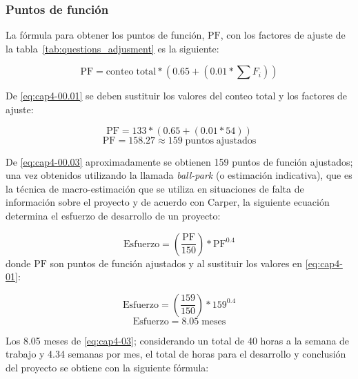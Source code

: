 \subsubsection*{Puntos de función}

La fórmula para obtener los puntos de función, $\mathrm{PF}$, con los factores de ajuste de la tabla~\ref{tab:questions_adjusment} es la siguiente:

\begin{equation} \label{eq:cap4-00.01}
	\mathrm{PF} = \mathrm{conteo\; total} *  (0.65 + (0.01 * \sum F_i))
\end{equation}

De \eqref{eq:cap4-00.01} se deben sustituir los valores del conteo total y los factores de ajuste:

\begin{equation} \label{eq:cap4-00.02}
	\mathrm{PF} =  133 *  (0.65 + (0.01 * 54))
\end{equation}
\begin{equation} \label{eq:cap4-00.03}
	\mathrm{PF} = 158.27 \approx 159 \mathrm{\;puntos\; ajustados}
\end{equation}


De \eqref{eq:cap4-00.03} aproximadamente se obtienen 159 puntos de función ajustados; una vez obtenidos utilizando la llamada \textit{ball-park} (o estimación indicativa), que es la técnica de macro-estimación que se utiliza en situaciones de falta de información sobre el proyecto y de acuerdo con Carper\cite{abran_applied_2006}, la siguiente ecuación determina el esfuerzo de desarrollo de un proyecto:


\begin{equation} \label{eq:cap4-01}
	\mathrm{Esfuerzo} = (\frac{\mathrm{PF}}{150})*\mathrm{PF}^{0.4}
\end{equation}
donde $\mathrm{PF}$ son puntos de función ajustados y al sustituir los valores en \eqref{eq:cap4-01}:

\begin{equation} \label{eq:cap4-02}
	\mathrm{Esfuerzo} = (\frac{159}{150})*159^{0.4}
\end{equation}
\begin{equation} \label{eq:cap4-03}
	\mathrm{Esfuerzo} = 8.05 \; \mathrm{meses}
\end{equation}




Los 8.05 meses de \eqref{eq:cap4-03}; considerando un total de 40 horas a la semana de trabajo y 4.34 semanas por mes, el total de horas para el desarrollo y conclusión del proyecto se obtiene con la siguiente fórmula:

